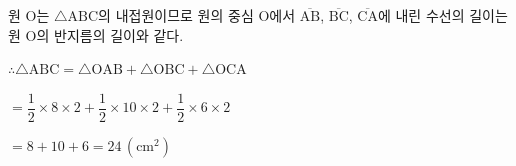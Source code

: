 원 $\mathrm{O}$는 $\triangle\mathrm{ABC}$의 내접원이므로 원의 중심 $\mathrm{O}$에서 $\overline{\mathrm{AB}}$, $\overline{\mathrm{BC}}$, $\overline{\mathrm{CA}}$에 내린 수선의 길이는 원 $\mathrm{O}$의 반지름의 길이와 같다.

$\therefore \triangle\mathrm{ABC} = \triangle\mathrm{OAB} + \triangle\mathrm{OBC} + \triangle\mathrm{OCA}$

$= \dfrac{1}{2}\times 8\times 2 + \dfrac{1}{2}\times 10\times 2 + \dfrac{1}{2}\times 6\times 2$

$= 8 + 10 + 6 = 24\,(\mathrm{cm}^2)$
